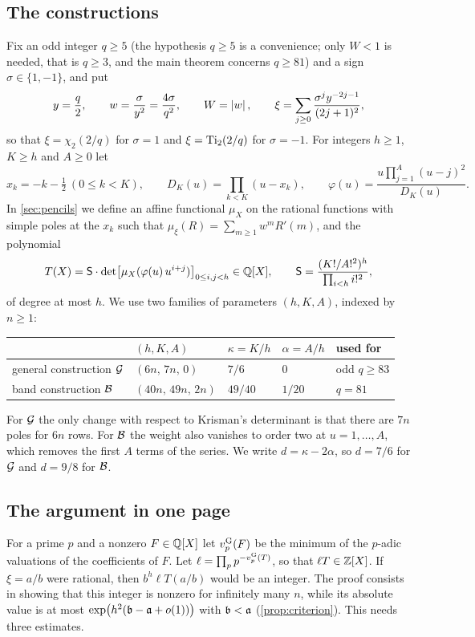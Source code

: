 \subsection{The constructions}\label{subsec:constructions}

Fix an odd integer $q\ge5$ (the hypothesis $q\ge5$ is a convenience; only $W<1$ is needed, that
is $q\ge3$, and the main theorem concerns $q\ge81$) and a sign $\sigma\in\{1,-1\}$, and put
\begin{equation}\label{eq:basic-notation}
  y=\frac q2,\qquad w=\frac{\sigma}{y^2}=\frac{4\sigma}{q^2},\qquad W=\left\lvert w\right\rvert,\qquad
  \xi=\sum_{j\ge0}\frac{\sigma^jy^{-2j-1}}{(2j+1)^2},
\end{equation}
so that $\xi=\chi_2(2/q)$ for $\sigma=1$ and $\xi=\operatorname{Ti}_2(2/q)$ for $\sigma=-1$. For integers
$h\ge1$, $K\ge h$ and $A\ge0$ let
\[
  x_k=-k-\tfrac12\ (0\le k<K),\qquad D_K(u)=\prod_{k<K}(u-x_k),\qquad
  \varphi(u)=\frac{u\prod_{j=1}^{A}(u-j)^2}{D_K(u)}.
\]
In \cref{sec:pencils} we define an affine functional $\mu_X$ on the rational functions with
simple poles at the $x_k$ such that $\mu_\xi(R)=\sum_{m\ge1}w^mR'(m)$, and the polynomial
\[
  T(X)=\mathsf{S}\cdot\det\bigl[\mu_X(\varphi(u)\,u^{i+j})\bigr]_{0\le i,j<h}\in\mathbb{Q}[X],
  \qquad \mathsf{S}=\frac{(K!/A!^2)^h}{\prod_{i<h}i!^2},
\]
of degree at most $h$. We use two families of parameters $(h,K,A)$, indexed by $n\ge1$:
\begin{center}
\begin{tabular}{@{}lllll@{}}
\toprule
 & $(h,K,A)$ & $\kappa=K/h$ & $\alpha=A/h$ & used for\\
\midrule
general construction $\mathcal{G}$ & $(6n,\,7n,\,0)$ & $7/6$ & $0$ & odd $q\ge83$\\
band construction $\mathcal{B}$ & $(40n,\,49n,\,2n)$ & $49/40$ & $1/20$ & $q=81$\\
\bottomrule
\end{tabular}
\end{center}
For $\mathcal{G}$ the only change with respect to Krisman's determinant is that there are $7n$ poles
for $6n$ rows. For $\mathcal{B}$ the weight also vanishes to order two at $u=1,\dots,A$, which removes
the first $A$ terms of the series. We write $d=\kappa-2\alpha$, so $d=7/6$ for $\mathcal{G}$ and
$d=9/8$ for $\mathcal{B}$.

\subsection{The argument in one page}\label{subsec:one-page}

For a prime $p$ and a nonzero $F\in\mathbb{Q}[X]$ let $v_{p}^{\mathrm{G}}(F)$ be the minimum of the $p$-adic
valuations of the coefficients of $F$. Let $\ell=\prod_pp^{-v_{p}^{\mathrm{G}}(T)}$, so that $\ell T\in\mathbb{Z}[X]$.
If $\xi=a/b$ were rational, then $b^h\ell T(a/b)$ would be an integer. The proof consists in
showing that this integer is nonzero for infinitely many $n$, while its absolute value is at
most $\exp\bigl(h^2(\mathfrak{b}-\mathfrak{a}+o(1))\bigr)$ with $\mathfrak{b}<\mathfrak{a}$
(\cref{prop:criterion}). This needs three estimates.

